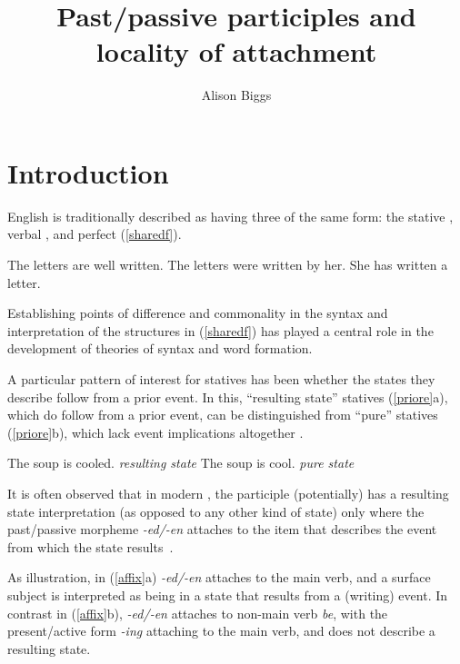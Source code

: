 \documentclass[output=paper,modfonts,nonflat]{langsci/langscibook}
\title{Past/passive participles and locality of attachment}
\author{Alison Biggs\affiliation{Georgetown University}}
\begin{document}
\glsresetall

\maketitle

\section{Introduction}

English is traditionally described as having three  of the same
form: the stative , verbal , and perfect (\ref{sharedf}).

\begin{exe}
\ex\label{sharedf}
    \begin{xlist}
    \ex The letters are well written.
    \ex The letters were written by her.
    \ex She has written a letter.
    \end{xlist}
\end{exe}

Establishing points of difference and commonality in the syntax and
interpretation of the structures in (\ref{sharedf}) has played a central role
in the development of theories of syntax and word formation.

A particular pattern of interest for statives has been whether the states they
describe follow from a prior event. In this, \enquote{resulting state} statives
(\ref{priore}a), which do follow from a prior event, can be distinguished from
\enquote{pure} statives (\ref{priore}b), which lack event implications altogether
\citep{Parsons1990a, Embick2004a}.

\begin{exe}
\ex\label{priore}
    \begin{xlist}
    \ex The soup is cooled. \hfill \emph{resulting state}
    \ex The soup is cool. \hfill \emph{pure state}
    \end{xlist}
\end{exe}

It is often observed that in modern , the participle (potentially)
has a resulting state interpretation (as opposed to any other kind of state)
only where the past/passive morpheme \emph{-ed/-en} attaches to the item that
describes the event from which the state results~\citep[e.g.\ ][]{Parsons1990a,
Kratzer2001a, Alexiadou2008a, AlexiadouEtAl2015}.

As illustration, in (\ref{affix}a) \emph{-ed/-en} attaches to the main verb,
and a surface subject is interpreted as being in a state that results from a
(writing) event. In  contrast in (\ref{affix}b), \emph{-ed/-en} attaches to
non-main verb \emph{be}, with the present/active form \emph{-ing} attaching to
the main verb, and does not describe a resulting state.
\end{document}
